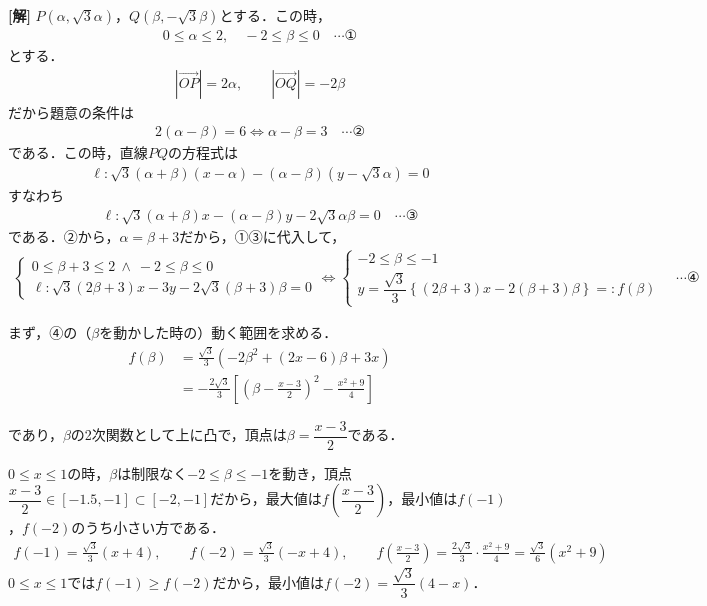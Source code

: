 \documentclass[../main.tex]{subfiles}
\begin{document}
{\bf [解]}
$P(\alpha,\sqrt3\alpha)$，$Q(\beta,-\sqrt3\beta)$とする．この時，
\begin{align*}
  0\le\alpha\le2,\quad-2\le\beta\le0\quad\cdots①
\end{align*}
とする．
\begin{align*}
  |\overrightarrow{OP}|=2\alpha,\qquad|\overrightarrow{OQ}|=-2\beta
\end{align*}
だから題意の条件は
\begin{align*}
  2(\alpha-\beta)=6\iff\alpha-\beta=3\quad\cdots②
\end{align*}
である．この時，直線$PQ$の方程式は
\begin{align*}
  \ell:\sqrt3(\alpha+\beta)(x-\alpha)-(\alpha-\beta)(y-\sqrt3\alpha)=0
\end{align*}
すなわち
\begin{align*}
  \ell:\sqrt3(\alpha+\beta)x-(\alpha-\beta)y-2\sqrt3\alpha\beta=0\quad\cdots③
\end{align*}
である．②から，$\alpha=\beta+3$だから，①③に代入して，
\begin{align*}
  \begin{cases}
    0\le\beta+3\le2\ \land\ -2\le\beta\le0\\
    \ell:\sqrt3(2\beta+3)x-3y-2\sqrt3(\beta+3)\beta=0
  \end{cases}
  \iff
  \begin{cases}
    -2\le\beta\le-1\\
    y=\dfrac{\sqrt3}3\left\{(2\beta+3)x-2(\beta+3)\beta\right\}=:f(\beta)
  \end{cases}\quad\cdots④
\end{align*}

まず，④の（$\beta$を動かした時の）動く範囲を求める．
\begin{align*}
  f(\beta)&=\frac{\sqrt3}3\left(-2\beta^2+(2x-6)\beta+3x\right)\\
  &=-\frac{2\sqrt3}3\left[\left(\beta-\frac{x-3}2\right)^2-\frac{x^2+9}4\right]
\end{align*}

であり，$\beta$の2次関数として上に凸で，頂点は$\beta=\dfrac{x-3}2$である．

$0\le x\le1$の時，$\beta$は制限なく$-2\le\beta\le-1$を動き，頂点$\dfrac{x-3}2\in[-1.5,-1]\subset[-2,-1]$だから，最大値は$f\left(\dfrac{x-3}2\right)$，最小値は$f(-1)$，$f(-2)$のうち小さい方である．
\begin{align*}
  f(-1)=\frac{\sqrt3}3(x+4),\qquad f(-2)=\frac{\sqrt3}3(-x+4),\qquad f\left(\frac{x-3}2\right)=\frac{2\sqrt3}3\cdot\frac{x^2+9}4=\frac{\sqrt3}6(x^2+9)
\end{align*}
$0\le x\le1$では$f(-1)\ge f(-2)$だから，最小値は$f(-2)=\dfrac{\sqrt3}3(4-x)$．
\end{document}
